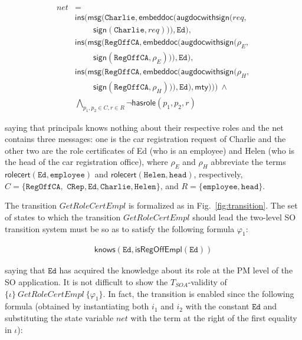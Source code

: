 \documentclass[conference]{IEEEtran}
\begin{document}
\begin{LONG}
\begin{small}\begin{align*}
\mathit{net} & = \\
& \mathsf{ins}(\mathsf{msg}(\mathtt{Charlie},\mathsf{embeddoc} (\mathsf{augdocwithsign}(req, \\
  & ~~~~~~~~~~ \mathsf{sign}(\mathtt{Charlie},req))), \mathtt{Ed}),\\
  & \mathsf{ins}(\mathsf{msg}(\mathtt{RegOffCA},\mathsf{embeddoc} (\mathsf{augdocwithsign}(\rho_E, \\
  & ~~~~~~~~~~\mathsf{sign}(\mathtt{RegOffCA},\rho_E))), \mathtt{Ed}), \\
  & \mathsf{ins}(\mathsf{msg}(\mathtt{RegOffCA}, \mathsf{embeddoc}(\mathsf{augdocwithsign}(\rho_H, \\
  & ~~~~~~~~~~\mathsf{sign}(\mathtt{RegOffCA},\rho_H))), \mathtt{Ed}),\mathsf{mty}))) ~ \wedge \\
  & \bigwedge_{p_1,p_2\in C, r\in R} \neg \mathsf{hasrole}(p_1,p_2,r)
\end{align*}\end{small}


\noindent
  saying that principals knows nothing about their respective roles
  and the net contains three messages: one is the car registration
  request of Charlie and the other two are the role certificates of Ed
  (who is an employee) and Helen (who is the head of the car
  registration office), where $\rho_E$ and $\rho_H$ abbreviate the
  terms $\mathsf{rolecert}(\mathtt{Ed},\mathtt{employee})$ and
  $\mathsf{rolecert}(\mathtt{Helen},\mathtt{head})$, respectively, $C=\{
  \mathtt{RegOffCA},$ $\mathtt{CRep}, \mathtt{Ed}, \mathtt{Charlie},
  \mathtt{Helen}\}$, and $R=\{\mathtt{employee}, \mathtt{head}\}$.

  The transition $\mathit{GetRoleCertEmpl}$ is formalized as in Fig.~\ref{fig:transition}.
  The set of states to which the transition $\mathit{GetRoleCertEmpl}$
  should lead the two-level SO transition system must be so as to satisfy the
  following formula $\varphi_1$:
  
\begin{small}  \begin{eqnarray*}
    \mathsf{knows}(\mathtt{Ed}, \mathsf{isRegOffEmpl}(\mathtt{Ed}))
  \end{eqnarray*}\end{small}

\noindent
  saying that $\mathtt{Ed}$ has acquired the knowledge about its role
  at the PM level of the SO application.  It is not difficult to show
  the $T_\mathit{SOA}$-validity of $\{\iota\}~ \mathit{GetRoleCertEmpl}~
  \{\varphi_1\}$.  In fact, the transition is enabled since the
  following formula (obtained by instantiating both $i_1$ and $i_2$
  with the constant $\mathtt{Ed}$ and substituting the state variable
  $\mathit{net}$ with the term at the right of the first equality 
  in $\iota$):
  

\end{LONG}
\end{document}
